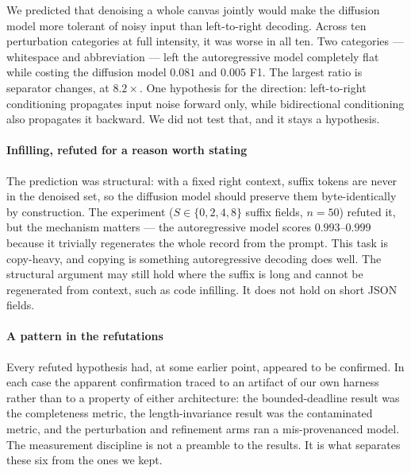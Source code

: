 We predicted that denoising a whole canvas jointly would make the diffusion
model more tolerant of noisy input than left-to-right decoding. Across ten
perturbation categories at full intensity, it was worse in all ten. Two
categories --- whitespace and abbreviation --- left the autoregressive model
completely flat while costing the diffusion model $0.081$ and $0.005$ F1.
The largest ratio is separator changes, at $8.2\times$. One hypothesis for the
direction: left-to-right conditioning propagates input noise forward only,
while bidirectional conditioning also propagates it backward. We did not test
that, and it stays a hypothesis. \paragraph{Infilling, refuted for a reason worth stating}
The prediction was structural: with a fixed right context, suffix tokens are
never in the denoised set, so the diffusion model should preserve them
byte-identically by construction. The experiment ($S \in \{0,2,4,8\}$ suffix
fields, $n{=}50$) refuted it, but the mechanism matters --- the
autoregressive model scores $0.993$--$0.999$ because it trivially
regenerates the whole record from the prompt. This task is copy-heavy, and
copying is something autoregressive decoding does well. The structural
argument may still hold where the suffix is long and cannot be regenerated
from context, such as code infilling. It does not hold on short JSON fields. \paragraph{A pattern in the refutations}
Every refuted hypothesis had, at some earlier point, appeared to be
confirmed. In each case the apparent confirmation traced to an artifact of
our own harness rather than to a property of either architecture: the
bounded-deadline result was the completeness metric, the length-invariance
result was the contaminated metric, and the perturbation and refinement arms
ran a mis-provenanced model. The measurement discipline is not a preamble to
the results. It is what separates these six from the ones we kept.
